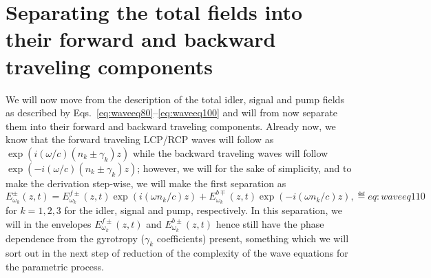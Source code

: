 \section{Separating the total fields into their forward and backward
         traveling components}
We will now move from the description of the total idler, signal and pump fields
as described by Eqs.~\eqref{eq:waveeq80}--\eqref{eq:waveeq100} and will from now
separate them into their forward and backward traveling components.
Already now, we know that the forward traveling LCP/RCP waves will follow as
$\exp(i(\omega/c)(n_k\pm\gamma_k)z)$ while the backward traveling waves will
follow $\exp(-i(\omega/c)(n_k\pm\gamma_k)z)$; however, we will for the sake of
simplicity, and to make the derivation step-wise, we will make the first
separation as
$$
  E^{\pm}_{\omega_k}(z,t)=
    E^{f\pm}_{\omega_k}(z,t)\exp(i(\omega n_k/c)z)
    +E^{b\mp}_{\omega_k}(z,t)\exp(-i(\omega n_k/c)z),
  \eqdef{eq:waveeq110}
$$
for $k=1,2,3$ for the idler, signal and pump, respectively. In this separation,
we will in the envelopes $E^{f\pm}_{\omega_k}(z,t)$ and $E^{b\pm}_{\omega_k}(z,t)$
hence still have the phase dependence from the gyrotropy ($\gamma_k$
coefficients) present, something which we will sort out in the next step of
reduction of the complexity of the wave equations for the parametric process.

